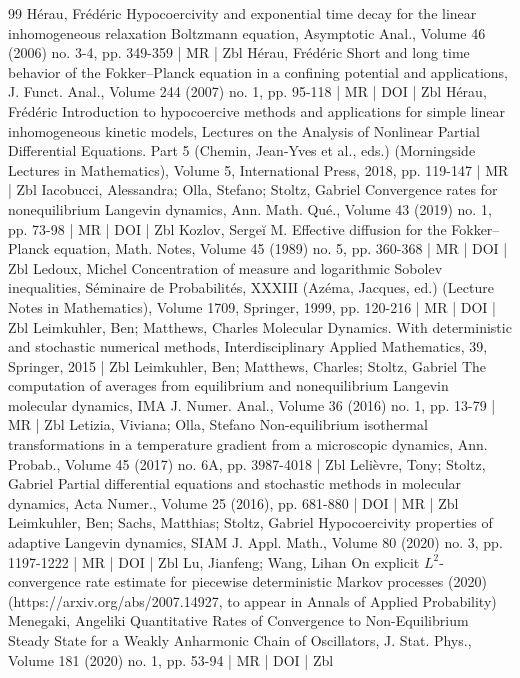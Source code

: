 \begin{thebibliography}{99}
Hérau, Frédéric Hypocoercivity and exponential time decay for the linear inhomogeneous relaxation Boltzmann equation, Asymptotic Anal., Volume 46 (2006) no. 3-4, pp. 349-359 | MR | Zbl
Hérau, Frédéric Short and long time behavior of the Fokker–Planck equation in a confining potential and applications, J. Funct. Anal., Volume 244 (2007) no. 1, pp. 95-118 | MR | DOI | Zbl
Hérau, Frédéric Introduction to hypocoercive methods and applications for simple linear inhomogeneous kinetic models, Lectures on the Analysis of Nonlinear Partial Differential Equations. Part 5 (Chemin, Jean-Yves et al., eds.) (Morningside Lectures in Mathematics), Volume 5, International Press, 2018, pp. 119-147 | MR | Zbl
Iacobucci, Alessandra; Olla, Stefano; Stoltz, Gabriel Convergence rates for nonequilibrium Langevin dynamics, Ann. Math. Qué., Volume 43 (2019) no. 1, pp. 73-98 | MR | DOI | Zbl
Kozlov, Sergeĭ M. Effective diffusion for the Fokker–Planck equation, Math. Notes, Volume 45 (1989) no. 5, pp. 360-368 | MR | DOI | Zbl
Ledoux, Michel Concentration of measure and logarithmic Sobolev inequalities, Séminaire de Probabilités, XXXIII (Azéma, Jacques, ed.) (Lecture Notes in Mathematics), Volume 1709, Springer, 1999, pp. 120-216 | MR | DOI | Zbl
Leimkuhler, Ben; Matthews, Charles Molecular Dynamics. With deterministic and stochastic numerical methods, Interdisciplinary Applied Mathematics, 39, Springer, 2015 | Zbl
Leimkuhler, Ben; Matthews, Charles; Stoltz, Gabriel The computation of averages from equilibrium and nonequilibrium Langevin molecular dynamics, IMA J. Numer. Anal., Volume 36 (2016) no. 1, pp. 13-79 | MR | Zbl
Letizia, Viviana; Olla, Stefano Non-equilibrium isothermal transformations in a temperature gradient from a microscopic dynamics, Ann. Probab., Volume 45 (2017) no. 6A, pp. 3987-4018 | Zbl
Lelièvre, Tony; Stoltz, Gabriel Partial differential equations and stochastic methods in molecular dynamics, Acta Numer., Volume 25 (2016), pp. 681-880 | DOI | MR | Zbl
Leimkuhler, Ben; Sachs, Matthias; Stoltz, Gabriel Hypocoercivity properties of adaptive Langevin dynamics, SIAM J. Appl. Math., Volume 80 (2020) no. 3, pp. 1197-1222 | MR | DOI | Zbl
Lu, Jianfeng; Wang, Lihan On explicit ${L}^2$-convergence rate estimate for piecewise deterministic Markov processes (2020) (https://arxiv.org/abs/2007.14927, to appear in Annals of Applied Probability)
Menegaki, Angeliki Quantitative Rates of Convergence to Non-Equilibrium Steady State for a Weakly Anharmonic Chain of Oscillators, J. Stat. Phys., Volume 181 (2020) no. 1, pp. 53-94 | MR | DOI | Zbl

\end{thebibliography}
